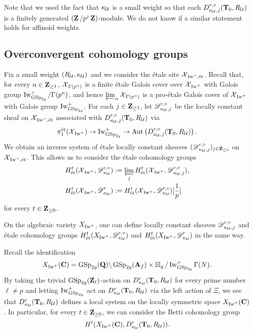 \begin{Remark}
\normalfont Note that we used the fact that $\kappa_{\calU}$ is a small weight so that each $D_{\kappa_{\calU}, j}^{r, \circ}(\T_0, R_{\calU})$ is a finitely generated $(\Z/p^j\Z)$-module. We do not know if a similar statement holds for affinoid weights.
\end{Remark}


\subsection{Overconvergent cohomology groups}\label{subsection: overconvergent cohomology groups}
Fix a small weight $(R_{\calU}, \kappa_{\calU})$ and we consider the \'{e}tale site $\calX_{\Iw^+, \et}$. Recall that, for every $n\in\Z_{\geq 1}$, $\calX_{\Gamma(p^n)}$ is a finite \'{e}tale Galois cover over $\calX_{\Iw^+}$ with Galois group $\Iw_{\GSp_{2g}}^+/\Gamma(p^n)$, and hence $\varprojlim_n\calX_{\Gamma(p^n)}$ is a pro-\'{e}tale Galois cover of $\calX_{\Iw^+}$ with Galois group $\Iw_{\GSp_{2g}}^+$. For each $j\in \Z_{\geq 1}$, let $\scrD_{\kappa_{\calU}, j}^{r, \circ}$ be the locally constant sheaf on $\calX_{\Iw^+, \et}$ associated with $D_{\kappa_{\calU}, j}^{r, \circ}(\T_0, R_{\calU})$ via $$\pi_1^{\et}(\calX_{\Iw^+})\rightarrow \Iw_{\GSp_{2g}}^+\rightarrow \Aut\left(D_{\kappa_{\calU}, j}^{r, \circ}(\T_0, R_{\calU})\right).$$ We obtain an inverse system of \'etale locally constant sheaves $(\scrD_{\kappa_{\calU}, j}^{r, \circ})_{j\in \Z_{\geq 1}}$ on $\calX_{\Iw^+, \et}$. This allows us to consider the \'{e}tale cohomology groups \begin{align*}
    & H_{\et}^t(\calX_{\Iw^+}, \scrD_{\kappa_{\calU}}^{r, \circ}):=\varprojlim_{j}H_{\et}^t(\calX_{\Iw^+}, \scrD_{\kappa_{\calU}, j}^{r, \circ}),\\
    & H_{\et}^t(\calX_{\Iw^+}, \scrD_{\kappa_{\calU}}^{r}):=H_{\et}^t(\calX_{\Iw^+}, \scrD_{\kappa_{\calU}}^{r, \circ})[\frac{1}{p}]
\end{align*} for every $t\in \Z_{\geq 0}$. 

\begin{Remark}
\normalfont On the algebraic variety $X_{\Iw^+}$, one can define locally constant sheaves $\scrD_{\kappa_{\calU}, j}^{r, \circ}$ and \'etale cohomology groups $H_{\et}^t(X_{\Iw^+}, \scrD_{\kappa_{\calU}}^{r, \circ})$ and $H_{\et}^t(X_{\Iw^+}, \scrD_{\kappa_{\calU}}^{r})$ in the same way.
\end{Remark}

Recall the identification \[
    X_{\Iw^+}(\C) = \GSp_{2g}(\Q)\backslash \GSp_{2g}(\A_f)\times \bbH_g/\Iw_{\GSp_{2g}}^+\Gamma(N).
\] By taking the trivial $\GSp_{2g}(\Z_{\ell})$-action on $D_{\kappa_{\calU}}^r(\T_0, R_{\calU})$ for every prime number $\ell\neq p$ and letting $\Iw_{\GSp_{2g}}^+$ act on $D_{\kappa_{\calU}}^r(\T_0, R_{\calU})$ via the left action of $\Xi$, we see that $D_{\kappa_{\calU}}^r(\T_0, R_{\calU})$ defines a local system on the locally symmetric space $X_{\Iw^+}(\C)$. In particular, for every $t\in \Z_{\geq 0}$, we can consider the Betti cohomology group \[
    H^t(X_{\Iw^+}(\C), D_{\kappa_{\calU}}^r(\T_0, R_{\calU})).
\]

